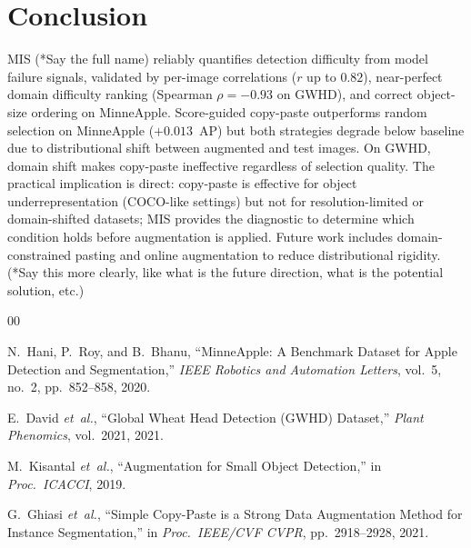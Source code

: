 \documentclass[conference]{IEEEtran}
\begin{document}
\section{Conclusion}

MIS (*Say the full name) reliably quantifies detection difficulty from model failure
signals, validated by per-image correlations ($r$ up to $0.82$),
near-perfect domain difficulty ranking (Spearman $\rho{=}-0.93$
on GWHD), and correct object-size ordering on MinneApple. 
Score-guided copy-paste outperforms random
selection on MinneApple ($+0.013$~AP) but both strategies degrade
below baseline due to distributional shift between augmented and
test images. On GWHD, domain shift makes copy-paste ineffective
regardless of selection quality. The practical implication is
direct: copy-paste is effective for object underrepresentation
(COCO-like settings) but not for resolution-limited or
domain-shifted datasets; MIS provides the diagnostic to determine
which condition holds before augmentation is applied. Future work
includes domain-constrained pasting and online augmentation to
reduce distributional rigidity. (*Say this more clearly, 
like what is the future direction, what is the potential solution, etc.)

\begin{thebibliography}{00}

N.~Hani, P.~Roy, and B.~Bhanu,
``MinneApple: A Benchmark Dataset for Apple Detection and
Segmentation,''
\textit{IEEE Robotics and Automation Letters},
vol.~5, no.~2, pp.~852--858, 2020.

E.~David \textit{et~al.},
``Global Wheat Head Detection (GWHD) Dataset,''
\textit{Plant Phenomics}, vol.~2021, 2021.

M.~Kisantal \textit{et~al.},
``Augmentation for Small Object Detection,''
in \textit{Proc.\ ICACCI}, 2019.

G.~Ghiasi \textit{et~al.},
``Simple Copy-Paste is a Strong Data Augmentation Method
for Instance Segmentation,''
in \textit{Proc.\ IEEE/CVF CVPR}, pp.~2918--2928, 2021.

\end{thebibliography}
\end{document}

